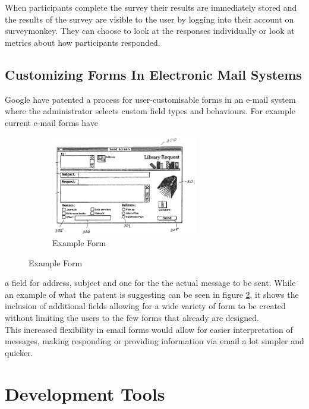 \documentclass[11pt]{report}
\begin{document}
When participants complete the survey their results are immediately stored and the results of the survey are visible to the user by logging into their account on surveymonkey. They can choose to look at the responses individually or look at metrics about how participants responded.


\subsection{Customizing Forms In Electronic Mail Systems}
\noindent
Google have patented \cite{_customizing_2006} a process for user-customisable forms in an e-mail system where the administrator selects custom field types and behaviours.  For example current e-mail forms have

\begin{figure}
\vspace*{-\baselineskip}
\begin{figure}[H]
\includegraphics[width=0.7\textwidth]{images/emailform.png}
	\caption{Example Form \cite{_customizing_2006}}
	\label{fig:emailform}
\end{figure}
\end{figure}

\noindent
a field for address, subject and one for the the actual message to be sent. While an example of what the patent is suggesting can be seen in figure \ref{fig:emailform}, it shows the inclusion of additional fields allowing for a wide variety of form to be created without limiting the users to  the few forms that already are designed.\\
This increased flexibility in email forms would allow for easier  interpretation of messages, making responding or providing information via email a lot simpler and quicker.


\section{Development Tools}
\end{document}
